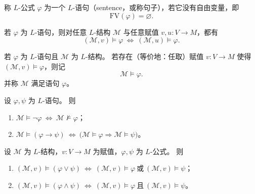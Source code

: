 \documentclass[lang=cn,a4paper,newtx,section]{elegantbook}
\begin{document}
\begin{definition}[语句（句子）]
\label{sentence}
称 $L$-公式 $\varphi$ 为一个 $L$-语句（sentence，或称句子），若它没有自由变量，即
\[
  \mathrm{FV}(\varphi)=\varnothing.
\]
\end{definition}

\begin{remark}
若 $\varphi$ 为 $L$-语句，则对任意 $L$-结构 $\mathcal M$ 与任意赋值 $v,u:V\to M$，都有
\[
  (\mathcal M,v)\models\varphi\ \Longleftrightarrow\ (\mathcal M,u)\models\varphi.
\]
\end{remark}

\begin{definition}[结构满足语句]
\label{structure-satisfies-sentence}
若 $\varphi$ 为 $L$-语句且 $\mathcal M$ 为 $L$-结构。
若存在（等价地：任取）赋值 $v:V\to M$ 使得 $(\mathcal M,v)\models\varphi$，则记
\[
  \mathcal M\models\varphi.
\]
并称 $\mathcal M$ 满足语句 $\varphi$。
\end{definition}

\begin{remark}
设 $\varphi,\psi$ 为 $L$-语句。
则
\begin{enumerate}
  \item $\mathcal M\models\neg\varphi\ \Longleftrightarrow\ \mathcal M\not\models\varphi$；
 \item $\mathcal M\models(\varphi\to\psi)\ \Longleftrightarrow\ \bigl(\mathcal M\models\varphi\Rightarrow\mathcal M\models\psi\bigr)$。
 \end{enumerate}
 \end{remark}

 \begin{proposition}[析取与合取的语义]
 \label{semantics-or-and}
 设 $\mathcal M$ 为 $L$-结构，$v:V\to M$ 为赋值，$\varphi,\psi$ 为 $L$-公式。
 则
 \begin{enumerate}
   \item $(\mathcal M,v)\models(\varphi\vee\psi)\ \Longleftrightarrow\ (\mathcal M,v)\models\varphi\ \text{或}\ (\mathcal M,v)\models\psi$；
   \item $(\mathcal M,v)\models(\varphi\wedge\psi)\ \Longleftrightarrow\ (\mathcal M,v)\models\varphi\ \text{且}\ (\mathcal M,v)\models\psi$。
 \end{enumerate}
 \end{proposition}
\end{document}
